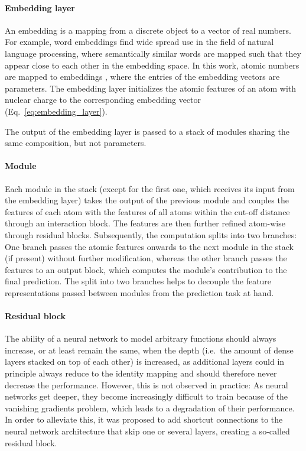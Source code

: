 \documentclass[12pt]{article}
\begin{document}
\paragraph{Embedding layer}
An embedding is a mapping from a discrete object to a vector of real
numbers. For example, word embeddings\cite{mikolov2013distributed}
find wide spread use in the field of natural language processing,
where semantically similar words are mapped such that they appear
close to each other in the embedding space. In this work, atomic
numbers  are mapped to embeddings , where the entries of the embedding vectors
 are parameters. The embedding layer initializes the
atomic features of an atom with nuclear charge  to the
corresponding embedding vector 
(Eq.~\ref{eq:embedding_layer}).

The output of the embedding layer is passed to a stack of  modules sharing the same composition, but not parameters.

\paragraph{Module}
Each module in the stack (except for the first one, which receives its
input from the embedding layer) takes the output of the previous
module and couples the features  of each atom  with
the features  of all atoms  within the cut-off
distance  through an interaction block. The features are
then further refined atom-wise through 
residual blocks. Subsequently, the computation splits into two
branches: One branch passes the atomic features onwards to the next
module in the stack (if present) without further modification, whereas
the other branch passes the features to an output block, which
computes the module's contribution to the final prediction. The split
into two branches helps to decouple the feature representations passed
between modules from the prediction task at hand.

\paragraph{Residual block}
The ability of a neural network to model arbitrary functions should
always increase, or at least remain the same, when the depth
(i.e.\ the amount of dense layers stacked on top of each other) is
increased, as additional layers could in principle always reduce to
the identity mapping and should therefore never decrease the
performance. However, this is not observed in practice: As neural
networks get deeper, they become increasingly difficult to train
because of the vanishing gradients
problem,\cite{glorot2010understanding} which leads to a degradation of
their performance. In order to alleviate this, it was proposed to add
shortcut connections to the neural network architecture that skip one
or several layers, creating a so-called residual
block.\cite{he2016deep}
\end{document}
